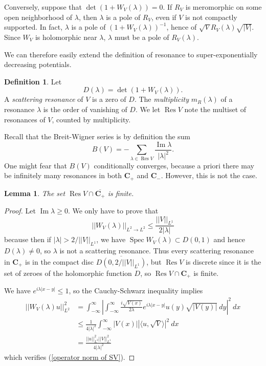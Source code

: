 \documentclass[12pt]{report}
\newcommand{\CC}{\mathbf{C}}
\DeclareMathOperator{\Res}{Res}
\DeclareMathOperator{\Spec}{Spec}
\newcommand{\dfn}[1]{\emph{#1}\index{#1}}
\renewcommand{\Im}{\operatorname{Im}}
\newtheorem{lemma}[theorem]{Lemma}
\theoremstyle{definition}
\newtheorem{definition}[theorem]{Definition}
\begin{document}
Conversely, suppose that $\det(1 + W_V(\lambda)) = 0$. If $R_V$ is meromorphic on some open neighborhood of $\lambda$, then $\lambda$ is a pole of $R_V$, even if $V$ is not compactly supported. In fact, $\lambda$ is a pole of $(1 + W_V(\lambda))^{-1}$, hence of $\sqrt VR_V(\lambda) \sqrt{|V|}$. Since $W_V$ is holomorphic near $\lambda$, $\lambda$ must be a pole of $R_V(\lambda)$.

We can therefore easily extend the definition of resonance to super-exponentially decreasing potentials.
\begin{definition}
\label{determinant definition of resonance}
Let
$$D(\lambda) = \det(1 + W_V(\lambda)).$$
A \dfn{scattering resonance} of $V$ is a zero of $D$. The \dfn{multiplicity} $m_R(\lambda)$ of a resonance $\lambda$ is the order of vanishing of $D$.
We let $\Res V$ note the multiset of resonances of $V$, counted by multiplicity.
\end{definition}

Recall that the Breit-Wigner series is by definition the sum
$$B(V) = -\sum_{\lambda \in \Res V} \frac{\Im \lambda}{|\lambda|^2}.$$
One might fear that $B(V)$ conditionally converges, because a priori there may be infinitely many resonances in both $\CC_+$ and $\CC_-$. However, this is not the case.
\begin{lemma}
\label{no resonances of positive imaginary part}
The set $\Res V \cap \overline{\CC_+}$ is finite.
\end{lemma}
\begin{proof}
Let $\Im \lambda \geq 0$. We only have to prove that
\begin{equation}
\label{operator norm of SV}
||W_V(\lambda)||_{L^2 \to L^2} \leq \frac{||V||_{L^1}}{2|\lambda|}
\end{equation}
because then if $|\lambda| > 2/||V||_{L^1}$, we have $\Spec W_V(\lambda) \subset D(0, 1)$ and hence $D(\lambda) \neq 0$, so $\lambda$ is not a scattering resonance. Thus every scattering resonance in $\CC_+$ is in the compact disc $\overline{D(0, 2/||V||_{L^1})}$, but $\Res V$ is discrete since it is the set of zeroes of the holomorphic function $D$, so $\Res V \cap \CC_+$ is finite.

We have $e^{i\lambda|x-y|} \leq 1$, so the Cauchy-Schwarz inequality implies
\begin{align*}
||W_V(\lambda)u||_{L^2}^2 &= \int_{-\infty}^\infty\left|\int_{-\infty}^\infty \frac{i\sqrt{V(x)}}{2\lambda} e^{i\lambda|x-y|}u(y)\sqrt{|V(y)|}~dy\right|^2~dx\\
&\leq \frac{1}{4|\lambda|^2} \int_{-\infty}^\infty |V(x)| \left|\langle u, \sqrt V\rangle\right|^2 ~dx\\
&= \frac{||u||_{L^2}^2 ||V||_{L^1}^2}{4|\lambda|^2}
\end{align*}
which verifies (\ref{operator norm of SV}).
\end{proof}
\end{document}
